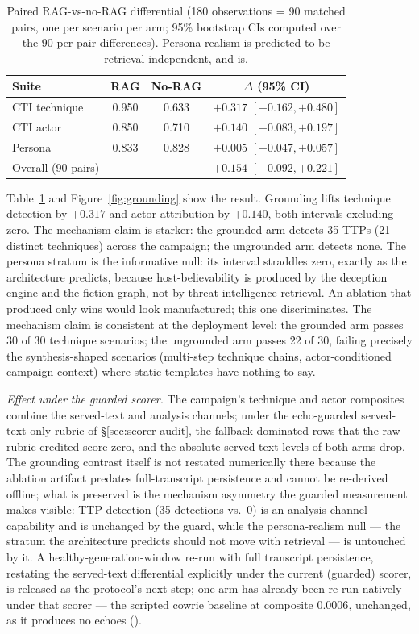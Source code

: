 \begin{table}[t]
\centering
\caption{Paired RAG-vs-no-RAG differential (180 observations = 90
matched pairs, one per scenario per arm; 95\% bootstrap CIs computed
over the 90 per-pair differences). Persona realism is predicted to be
retrieval-independent, and is.}
\label{tab:b4}
\begin{tabular}{lccc}
\toprule
Suite & RAG & No-RAG & $\Delta$ (95\% CI) \\
\midrule
CTI technique & 0.950 & 0.633 & $+0.317$ $[+0.162, +0.480]$ \\
CTI actor     & 0.850 & 0.710 & $+0.140$ $[+0.083, +0.197]$ \\
Persona       & 0.833 & 0.828 & $+0.005$ $[-0.047, +0.057]$ \\
\midrule
Overall (90 pairs) & & & $+0.154$ $[+0.092, +0.221]$ \\
\bottomrule
\end{tabular}
\end{table}


Table~\ref{tab:b4} and Figure~\ref{fig:grounding} show the result.
Grounding lifts technique detection
by $+0.317$ and actor attribution by $+0.140$, both intervals excluding
zero. The mechanism claim is starker: the grounded arm detects 35 TTPs
(21 distinct techniques) across the campaign; the ungrounded arm detects
none. The persona
stratum is the informative null: its interval straddles zero, exactly as
the architecture predicts, because host-believability is produced by the
deception engine and the fiction graph, not by threat-intelligence
retrieval. An ablation that produced only wins would look manufactured;
this one discriminates. The mechanism claim is consistent at the
deployment level: the grounded arm passes 30 of 30 technique scenarios;
the ungrounded arm passes 22 of 30, failing precisely the
synthesis-shaped scenarios (multi-step technique chains, actor-conditioned
campaign context) where static templates have nothing to say.

\emph{Effect under the guarded scorer.} The campaign's technique and
actor composites combine the served-text and analysis channels; under the
echo-guarded served-text-only rubric of \S\ref{sec:scorer-audit}, the
fallback-dominated rows that the raw rubric credited score zero, and the
absolute served-text levels of both arms drop. The grounding contrast
itself is not restated numerically there because the ablation artifact
predates full-transcript persistence and cannot be re-derived offline;
what is preserved is the mechanism asymmetry the guarded measurement
makes visible: TTP detection (35 detections vs.\ 0) is an analysis-channel
capability and is unchanged by the guard, while the persona-realism null
--- the stratum the architecture predicts should not move with retrieval
--- is untouched by it. A healthy-generation-window re-run with full
transcript persistence, restating the served-text differential explicitly
under the current (guarded) scorer, is released as the protocol's next
step; one arm has already been re-run natively under that scorer --- the
scripted cowrie baseline at composite $0.0006$, unchanged, as it
produces no echoes ().

